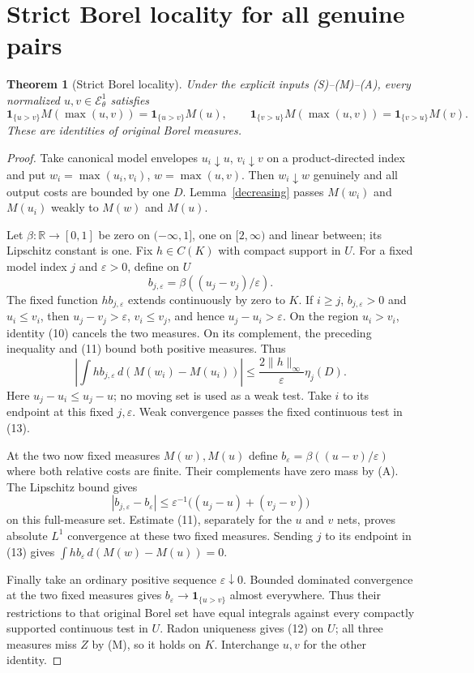\documentclass[11pt]{article}
\newtheorem{theorem}{Theorem}
\newcommand{\EE}{\mathcal E^1_\theta}
\begin{document}
\section{Strict Borel locality for all genuine pairs}
\begin{theorem}[Strict Borel locality]\label{borel}
Under the explicit inputs (S)--(M)--(A), every normalized
$u,v\in\EE$ satisfies
\[
 \mathbf1_{\{u>v\}}M(\max(u,v))
       =\mathbf1_{\{u>v\}}M(u),\qquad
 \mathbf1_{\{v>u\}}M(\max(u,v))
       =\mathbf1_{\{v>u\}}M(v).                         \tag{12}
\]
These are identities of original Borel measures.
\end{theorem}
\begin{proof}
Take canonical model envelopes $u_i\downarrow u$, $v_i\downarrow v$
on a product-directed index and put $w_i=\max(u_i,v_i)$,
$w=\max(u,v)$. Then $w_i\downarrow w$ genuinely and all output
costs are bounded by one $D$.
Lemma~\ref{decreasing} passes $M(w_i)$ and $M(u_i)$ weakly to
$M(w)$ and $M(u)$.

Let $\beta:\mathbb R\to[0,1]$ be zero on $(-\infty,1]$,
one on $[2,\infty)$ and linear between; its Lipschitz constant is one.
Fix $h\in C(K)$ with compact support in $U$.
For a fixed model index $j$ and $\varepsilon>0$, define on $U$
\[
 b_{j,\varepsilon}=\beta((u_j-v_j)/\varepsilon).
\]
The fixed function $h b_{j,\varepsilon}$ extends continuously by zero
to $K$. If $i\geq j$, $b_{j,\varepsilon}>0$ and $u_i\leq v_i$,
then $u_j-v_j>\varepsilon$, $v_i\leq v_j$, and hence
$u_j-u_i>\varepsilon$.
On the region $u_i>v_i$, identity (10) cancels the two measures.
On its complement, the preceding inequality and (11) bound both
positive measures. Thus
\[
 \left|\int h b_{j,\varepsilon}\,d(M(w_i)-M(u_i))\right|
       \leq \frac{2\|h\|_\infty}{\varepsilon}\eta_j(D).
                                                               \tag{13}
\]
Here $u_j-u_i\leq u_j-u$; no moving set is used as a weak test.
Take $i$ to its endpoint at this fixed $j,\varepsilon$.
Weak convergence passes the fixed continuous test in (13).

At the two now fixed measures $M(w),M(u)$ define
$b_\varepsilon=\beta((u-v)/\varepsilon)$ where both relative
costs are finite. Their complements have zero mass by (A).
The Lipschitz bound gives
\[
 |b_{j,\varepsilon}-b_\varepsilon|
 \leq \varepsilon^{-1}\big((u_j-u)+(v_j-v)\big)
\]
on this full-measure set. Estimate (11), separately for the
$u$ and $v$ nets, proves absolute $L^1$ convergence at these
two fixed measures. Sending $j$ to its endpoint in (13) gives
$\int h b_\varepsilon\,d(M(w)-M(u))=0$.

Finally take an ordinary positive sequence $\varepsilon\downarrow0$.
Bounded dominated convergence at the two fixed measures gives
$b_\varepsilon\to\mathbf1_{\{u>v\}}$ almost everywhere.
Thus their restrictions to that original Borel set have equal
integrals against every compactly supported continuous test in $U$.
Radon uniqueness gives (12) on $U$; all three measures miss $Z$
by (M), so it holds on $K$. Interchange $u,v$ for the other identity.
\end{proof}
\end{document}
